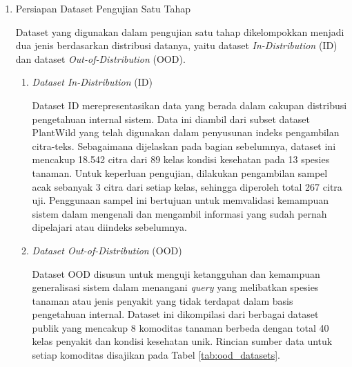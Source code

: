 \begin{enumerate}[label=\alph*., listparindent=\parindent, labelindent=0pt]
    \item Persiapan Dataset Pengujian Satu Tahap

    Dataset yang digunakan dalam pengujian satu tahap dikelompokkan menjadi dua jenis berdasarkan distribusi datanya, yaitu dataset \textit{In-Distribution} (ID) dan dataset \textit{Out-of-Distribution} (OOD).

    \begin{enumerate}[label=\arabic*., listparindent=\parindent, labelindent=0pt]
        \item \textit{Dataset In-Distribution} (ID)

        Dataset ID merepresentasikan data yang berada dalam cakupan distribusi pengetahuan internal sistem. Data ini diambil dari subset dataset PlantWild \parencite{weiBenchmarkingInthewildMultimodal2024} yang telah digunakan dalam penyusunan indeks pengambilan citra-teks. Sebagaimana dijelaskan pada bagian sebelumnya, dataset ini mencakup 18.542 citra dari 89 kelas kondisi kesehatan pada 13 spesies tanaman. Untuk keperluan pengujian, dilakukan pengambilan sampel acak sebanyak 3 citra dari setiap kelas, sehingga diperoleh total 267 citra uji. Penggunaan sampel ini bertujuan untuk memvalidasi kemampuan sistem dalam mengenali dan mengambil informasi yang sudah pernah dipelajari atau diindeks sebelumnya.

        \item \textit{Dataset Out-of-Distribution} (OOD)

        Dataset OOD disusun untuk menguji ketangguhan dan kemampuan generalisasi sistem dalam menangani \textit{query} yang melibatkan spesies tanaman atau jenis penyakit yang tidak terdapat dalam basis pengetahuan internal. Dataset ini dikompilasi dari berbagai dataset publik yang mencakup 8 komoditas tanaman berbeda dengan total 40 kelas penyakit dan kondisi kesehatan unik. Rincian sumber data untuk setiap komoditas disajikan pada Tabel \ref{tab:ood_datasets}.


\end{enumerate}
\end{enumerate}
